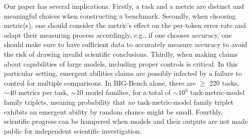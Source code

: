 Our paper has several implications. Firstly, a task and a metric are distinct and meaningful choices when constructing a benchmark. Secondly, when choosing metric(s), one should consider the metric's effect on the per-token error rate and adapt their measuring process accordingly, e.g., if one chooses accuracy, one should make sure to have sufficient data to accurately measure accuracy to avoid the risk of drawing invalid scientific conclusions.
Thirdly, when making claims about capabilities of large models, including proper controls is critical. In this particular setting, emergent abilities claims are possibly infected by a failure to control for multiple comparisons. In BIG-Bench alone, there are $\geq$ 220 tasks, $\sim 40$ metrics per task, $\sim10$ model families, for a total of $\sim 10^6$ task-metric-model family triplets, meaning probability that \textit{no} task-metric-model family triplet exhibits an emergent ability by random chance  might be small.
Fourthly, scientific progress can be hampered when models and their outputs are not made public for independent scientific investigation.




